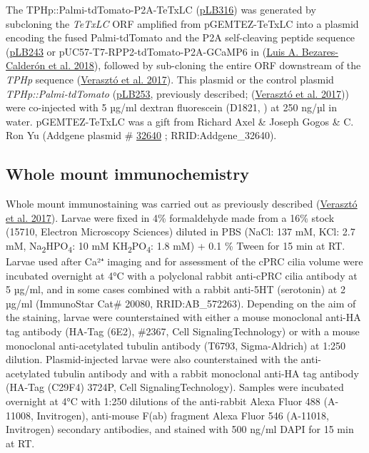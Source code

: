 \documentclass[
]{article}
\begin{document}
The TPHp::Palmi-tdTomato-P2A-TeTxLC
(\href{https://benchling.com/jekelylab/f/lib_sdvdcR5P-plasmidsstock_lbdb_jekelylab/seq_byQ18T5O-puc57-bamhi-tphp-asci-palmi-3xha-tdtomato-agei-p2a-noti-tetxlc-paci/edit}{pLB316})
was generated by subcloning the \emph{TeTxLC} ORF amplified from
pGEMTEZ-TeTxLC into a plasmid encoding the fused Palmi-tdTomato and the
P2A self-cleaving peptide sequence
(\href{https://benchling.com/jekelylab/f/lib_sdvdcR5P-plasmidsstock_lbdb_jekelylab/seq_mdeLSOGI-plb243/edit}{pLB243}
or pUC57-T7-RPP2-tdTomato-P2A-GCaMP6 in
(\protect\hyperlink{ref-bezares-calderon2018}{Luis A. Bezares-Calderón
et al. 2018}), followed by sub-cloning the entire ORF downstream of the
\emph{TPHp} sequence (\protect\hyperlink{ref-veraszto2017a}{Verasztó et
al. 2017}). This plasmid or the control plasmid
\emph{TPHp::Palmi-tdTomato}
(\href{https://benchling.com/jekelylab/f/lib_sdvdcR5P-plasmidsstock_lbdb_jekelylab/seq_oLuEhx86-plb253/edit}{pLB253},
previously described; (\protect\hyperlink{ref-veraszto2017a}{Verasztó et
al. 2017})) were co-injected with 5 µg/ml dextran fluorescein (D1821, )
at 250 ng/µl in water. pGEMTEZ-TeTxLC was a gift from Richard Axel \&
Joseph Gogos \& C. Ron Yu (Addgene plasmid \#
\href{http://n2t.net/addgene:32640}{32640} ; RRID:Addgene\_32640).

\hypertarget{whole-mount-immunochemistry}{%
\subsection{Whole mount
immunochemistry}\label{whole-mount-immunochemistry}}

Whole mount immunostaining was carried out as previously described
(\protect\hyperlink{ref-veraszto2017a}{Verasztó et al. 2017}). Larvae
were fixed in 4\% formaldehyde made from a 16\% stock (15710, Electron
Microscopy Sciences) diluted in PBS (NaCl: 137 mM, KCl: 2.7 mM,
Na\textsubscript{2}HPO\textsubscript{4}: 10 mM
KH\textsubscript{2}PO\textsubscript{4}: 1.8 mM) + 0.1 \% Tween for 15
min at RT. Larvae used after Ca²⁺ imaging and for assessment of the cPRC
cilia volume were incubated overnight at 4°C with a polyclonal rabbit
anti-cPRC cilia antibody at 5 µg/ml, and in some cases combined with a
rabbit anti-5HT (serotonin) at 2 µg/ml (ImmunoStar Cat\# 20080,
RRID:AB\_572263). Depending on the aim of the staining, larvae were
counterstained with either a mouse monoclonal anti-HA tag antibody
(HA-Tag (6E2), \#2367, Cell SignalingTechnology) or with a mouse
monoclonal anti-acetylated tubulin antibody (T6793, Sigma-Aldrich) at
1:250 dilution. Plasmid-injected larvae were also counterstained with
the anti-acetylated tubulin antibody and with a rabbit monoclonal
anti-HA tag antibody (HA-Tag (C29F4) 3724P, Cell SignalingTechnology).
Samples were incubated overnight at 4°C with 1:250 dilutions of the
anti-rabbit Alexa Fluor 488 (A-11008, Invitrogen), anti-mouse F(ab)
fragment Alexa Fluor 546 (A-11018, Invitrogen) secondary antibodies, and
stained with 500 ng/ml DAPI for 15 min at RT.
\end{document}
